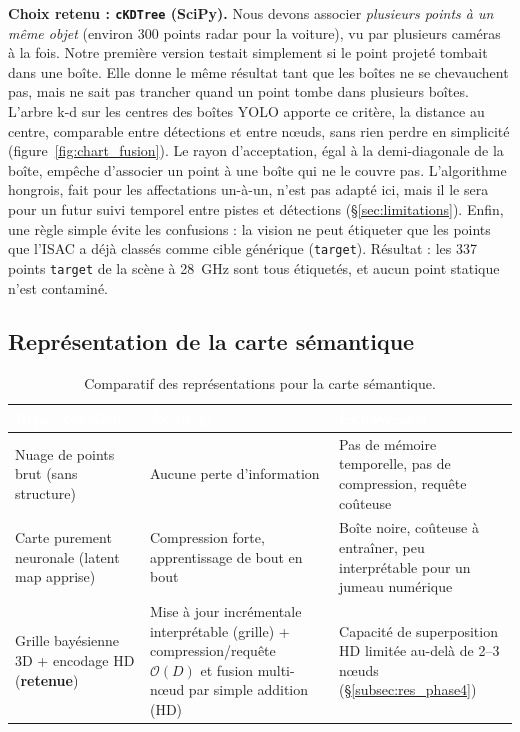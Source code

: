 \documentclass[12pt,a4paper,titlepage]{article}
\newcommand{\hd}[1]{\textcolor{white}{\textbf{#1}}}
\newcommand{\choix}{\rowcolor{tabchoice}}
\begin{document}
\textbf{Choix retenu : \texttt{cKDTree} (SciPy).} Nous devons associer \textit{plusieurs points à un même objet} (environ 300 points radar pour la voiture), vu par plusieurs caméras à la fois. Notre première version testait simplement si le point projeté tombait dans une boîte. Elle donne le même résultat tant que les boîtes ne se chevauchent pas, mais ne sait pas trancher quand un point tombe dans plusieurs boîtes. L'arbre k-d sur les centres des boîtes YOLO apporte ce critère, la distance au centre, comparable entre détections et entre n\oe uds, sans rien perdre en simplicité (figure~\ref{fig:chart_fusion}). Le rayon d'acceptation, égal à la demi-diagonale de la boîte, empêche d'associer un point à une boîte qui ne le couvre pas. L'algorithme hongrois, fait pour les affectations un-à-un, n'est pas adapté ici, mais il le sera pour un futur suivi temporel entre pistes et détections (\S\ref{sec:limitations}). Enfin, une règle simple évite les confusions : la vision ne peut étiqueter que les points que l'ISAC a déjà classés comme cible générique (\texttt{target}). Résultat : les 337 points \texttt{target} de la scène à 28~GHz sont tous étiquetés, et aucun point statique n'est contaminé.

\subsection{Représentation de la carte sémantique}

\begin{table}[H]
    \centering
    \caption{Comparatif des représentations pour la carte sémantique.}
    \begin{tabularx}{\textwidth}{F{3.8cm}LL}
        \toprule
        \hd{Représentation} & \hd{Avantage} & \hd{Inconvénient} \\
        \midrule
        Nuage de points brut (sans structure) & Aucune perte d'information & Pas de mémoire temporelle, pas de compression, requête coûteuse \\
        Carte purement neuronale (latent map apprise) & Compression forte, apprentissage de bout en bout & Boîte noire, coûteuse à entraîner, peu interprétable pour un jumeau numérique \\
        \choix Grille bayésienne 3D + encodage HD (\textbf{retenue}) & Mise à jour incrémentale interprétable (grille) + compression/requête $\mathcal{O}(D)$ et fusion multi-n\oe ud par simple addition (HD) & Capacité de superposition HD limitée au-delà de 2--3 n\oe uds (\S\ref{subsec:res_phase4}) \\
        \bottomrule
    \end{tabularx}
\end{table}
\end{document}
